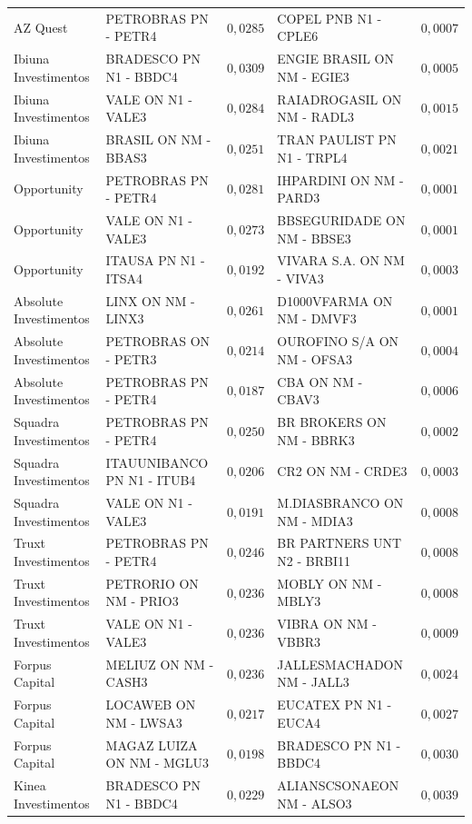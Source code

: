 \documentclass[11pt,a4paper]{article}
\begin{document}
\begin{center}
\begin{longtable}{@{}lp{3.9cm}rp{3.9cm}r@{}}
AZ Quest & PETROBRAS PN - PETR4 & $0{,}0285$ & COPEL PNB N1 - CPLE6 & $0{,}0007$ \\
Ibiuna Investimentos & BRADESCO PN N1 - BBDC4 & $0{,}0309$ & ENGIE BRASIL ON NM - EGIE3 & $0{,}0005$ \\
Ibiuna Investimentos & VALE ON N1 - VALE3 & $0{,}0284$ & RAIADROGASIL ON NM - RADL3 & $0{,}0015$ \\
Ibiuna Investimentos & BRASIL ON NM - BBAS3 & $0{,}0251$ & TRAN PAULIST PN N1 - TRPL4 & $0{,}0021$ \\
Opportunity & PETROBRAS PN - PETR4 & $0{,}0281$ & IHPARDINI ON NM - PARD3 & $0{,}0001$ \\
Opportunity & VALE ON N1 - VALE3 & $0{,}0273$ & BBSEGURIDADE ON NM - BBSE3 & $0{,}0001$ \\
Opportunity & ITAUSA PN N1 - ITSA4 & $0{,}0192$ & VIVARA S.A. ON NM - VIVA3 & $0{,}0003$ \\
Absolute Investimentos & LINX ON NM - LINX3 & $0{,}0261$ & D1000VFARMA ON NM - DMVF3 & $0{,}0001$ \\
Absolute Investimentos & PETROBRAS ON - PETR3 & $0{,}0214$ & OUROFINO S/A ON NM - OFSA3 & $0{,}0004$ \\
Absolute Investimentos & PETROBRAS PN - PETR4 & $0{,}0187$ & CBA ON NM - CBAV3 & $0{,}0006$ \\
Squadra Investimentos & PETROBRAS PN - PETR4 & $0{,}0250$ & BR BROKERS ON NM - BBRK3 & $0{,}0002$ \\
Squadra Investimentos & ITAUUNIBANCO PN N1 - ITUB4 & $0{,}0206$ & CR2 ON NM - CRDE3 & $0{,}0003$ \\
Squadra Investimentos & VALE ON N1 - VALE3 & $0{,}0191$ & M.DIASBRANCO ON NM - MDIA3 & $0{,}0008$ \\
Truxt Investimentos & PETROBRAS PN - PETR4 & $0{,}0246$ & BR PARTNERS UNT N2 - BRBI11 & $0{,}0008$ \\
Truxt Investimentos & PETRORIO ON NM - PRIO3 & $0{,}0236$ & MOBLY ON NM - MBLY3 & $0{,}0008$ \\
Truxt Investimentos & VALE ON N1 - VALE3 & $0{,}0236$ & VIBRA ON NM - VBBR3 & $0{,}0009$ \\
Forpus Capital & MELIUZ ON NM - CASH3 & $0{,}0236$ & JALLESMACHADON NM - JALL3 & $0{,}0024$ \\
Forpus Capital & LOCAWEB ON NM - LWSA3 & $0{,}0217$ & EUCATEX PN N1 - EUCA4 & $0{,}0027$ \\
Forpus Capital & MAGAZ LUIZA ON NM - MGLU3 & $0{,}0198$ & BRADESCO PN N1 - BBDC4 & $0{,}0030$ \\
Kinea Investimentos & BRADESCO PN N1 - BBDC4 & $0{,}0229$ & ALIANSCSONAEON NM - ALSO3 & $0{,}0039$ \\

\end{longtable}
\end{center}
\end{document}
